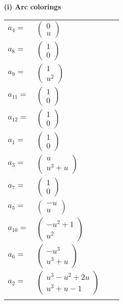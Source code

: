 \documentclass[1p]{elsarticle_modified}
\theoremstyle{definition}
\begin{document}
\flushleft \textbf{(i) Arc colorings}\\
\begin{tabular}{m{7pt} m{180pt} m{7pt} m{180pt} }
\flushright $a_{4}=$&$\begin{pmatrix}0\\u\end{pmatrix}$ \\
\flushright $a_{8}=$&$\begin{pmatrix}1\\0\end{pmatrix}$ \\
\flushright $a_{9}=$&$\begin{pmatrix}1\\u^2\end{pmatrix}$ \\
\flushright $a_{11}=$&$\begin{pmatrix}1\\0\end{pmatrix}$ \\
\flushright $a_{12}=$&$\begin{pmatrix}1\\0\end{pmatrix}$ \\
\flushright $a_{1}=$&$\begin{pmatrix}1\\0\end{pmatrix}$ \\
\flushright $a_{3}=$&$\begin{pmatrix}u\\u^3+u\end{pmatrix}$ \\
\flushright $a_{7}=$&$\begin{pmatrix}1\\0\end{pmatrix}$ \\
\flushright $a_{5}=$&$\begin{pmatrix}- u\\u\end{pmatrix}$ \\
\flushright $a_{10}=$&$\begin{pmatrix}- u^2+1\\u^2\end{pmatrix}$ \\
\flushright $a_{6}=$&$\begin{pmatrix}- u^3\\u^3+u\end{pmatrix}$ \\
\flushright $a_{2}=$&$\begin{pmatrix}u^3- u^2+2 u\\u^3+u-1\end{pmatrix}$\\&\end{tabular}
\end{document}
